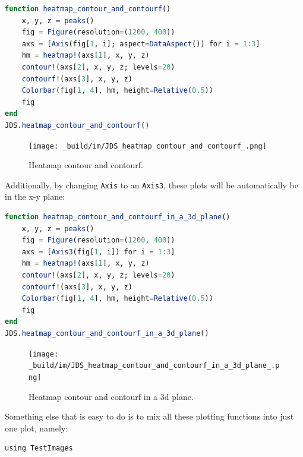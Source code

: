 \documentclass[
  notoc %
]{tufte-book}
\newcommand{\passthrough}[1]{#1}
\begin{document}
\begin{lstlisting}[language=Julia]
function heatmap_contour_and_contourf()
    x, y, z = peaks()
    fig = Figure(resolution=(1200, 400))
    axs = [Axis(fig[1, i]; aspect=DataAspect()) for i = 1:3]
    hm = heatmap!(axs[1], x, y, z)
    contour!(axs[2], x, y, z; levels=20)
    contourf!(axs[3], x, y, z)
    Colorbar(fig[1, 4], hm, height=Relative(0.5))
    fig
end
JDS.heatmap_contour_and_contourf()
\end{lstlisting}

\begin{figure}
\hypertarget{fig:heatmap_contour_and_contourf}{%
\centering
\texttt{[image: \_build/im/JDS\_heatmap\_contour\_and\_contourf\_.png]}
\caption{Heatmap contour and
contourf.}\label{fig:heatmap_contour_and_contourf}
}
\end{figure}

Additionally, by changing \passthrough{\lstinline!Axis!} to an
\passthrough{\lstinline!Axis3!}, these plots will be automatically be in
the x-y plane:

\begin{lstlisting}[language=Julia]
function heatmap_contour_and_contourf_in_a_3d_plane()
    x, y, z = peaks()
    fig = Figure(resolution=(1200, 400))
    axs = [Axis3(fig[1, i]) for i = 1:3]
    hm = heatmap!(axs[1], x, y, z)
    contour!(axs[2], x, y, z; levels=20)
    contourf!(axs[3], x, y, z)
    Colorbar(fig[1, 4], hm, height=Relative(0.5))
    fig
end
JDS.heatmap_contour_and_contourf_in_a_3d_plane()
\end{lstlisting}

\begin{figure}
\hypertarget{fig:heatmap_contour_and_contourf_in_a_3d_plane}{%
\centering
\texttt{[image: \_build/im/JDS\_heatmap\_contour\_and\_contourf\_in\_a\_3d\_plane\_.png]}
\caption{Heatmap contour and contourf in a 3d
plane.}\label{fig:heatmap_contour_and_contourf_in_a_3d_plane}
}
\end{figure}

Something else that is easy to do is to mix all these plotting functions
into just one plot, namely:

\begin{lstlisting}
using TestImages
\end{lstlisting}
\end{document}
